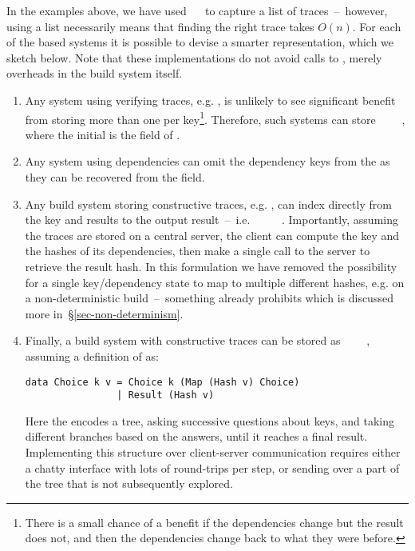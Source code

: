 In the examples above, we have used \hs{[Trace}~~\hs{v]} to capture a list
of traces~--~however, using a list necessarily means that finding the right trace
takes $O(n)$. For each of the  based systems it is possible to devise
a smarter representation, which we sketch below. Note that these implementations
do not avoid calls to , merely overheads in the build system itself.

\begin{enumerate}
\item Any system using verifying traces, e.g. \Shake, is unlikely to see significant benefit from storing more than one  per key\footnote{There is a small chance of a benefit if the dependencies change but the result does not, and then the dependencies change back to what they were before.}. Therefore, such systems can store ~~~~, where the initial  is the  field of .
\item Any system using  dependencies can omit the dependency keys from the  as they can be recovered from the  field.
\item Any  build system storing constructive traces, e.g. \Bazel, can index directly from the key and results to the output result~--~i.e. ~~\hs{[Hash}~\hs{v])}~~. Importantly, assuming the traces are stored on a central server, the client can compute the key and the hashes of its dependencies, then make a single call to the server to retrieve the result hash. In this formulation we have removed the possibility for a single key/dependency state to map to multiple different hashes, e.g. on a non-deterministic build~--~something \Bazel already prohibits which is discussed more in~\S\ref{sec-non-determinism}.
\item Finally, a  build system with constructive traces can be stored as ~~~~, assuming a definition of  as:
\begin{verbatim}
data Choice k v = Choice k (Map (Hash v) Choice)
                | Result (Hash v)
\end{verbatim}
Here the  encodes a tree, asking successive questions about keys, and taking different branches based on the answers, until it reaches a final result. Implementing this structure over client-server communication requires either a chatty interface with lots of round-trips per  step, or sending over a part of the tree that is not subsequently explored.
\end{enumerate}
